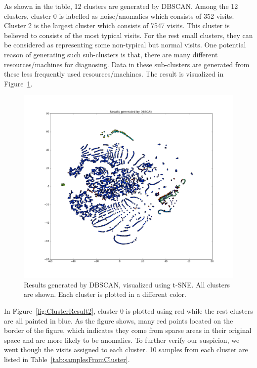 As shown in the table, 12 clusters are generated by DBSCAN. Among the 12 clusters, cluster 0 is labelled as noise/anomalies which consists of 352 visits. Cluster 2 is the largest cluster which consists of 7547 visits. This cluster is believed to consists of the most typical visits. For the rest small clusters, they can be considered as representing some non-typical but normal visits. One potential reason of generating such sub-clusters is that, there are many different resources/machines for diagnosing. Data in these sub-clusters are generated from these less frequently used resources/machines. The result is visualized in Figure~\ref{fig:ClusterResult}.

\begin{figure}[!ht]
	\begin{center}
		\includegraphics[width=\textwidth]{images/ClusterResult}
		\caption{Results generated by DBSCAN, visualized using t-SNE. All clusters are shown. Each cluster is plotted in a different color.}
		\label{fig:ClusterResult}
	\end{center}
\end{figure}

In Figure~\ref{fig:ClusterResult2}, cluster 0 is plotted using red while the rest clusters are all painted in blue. As the figure shows, many red points located on the border of the figure, which indicates they come from sparse areas in their original space and are more likely to be anomalies. To further verify our suspicion, we went though the visits assigned to each cluster. 10 samples from each cluster are listed in Table~\ref{tab:samplesFromCluster}. 


